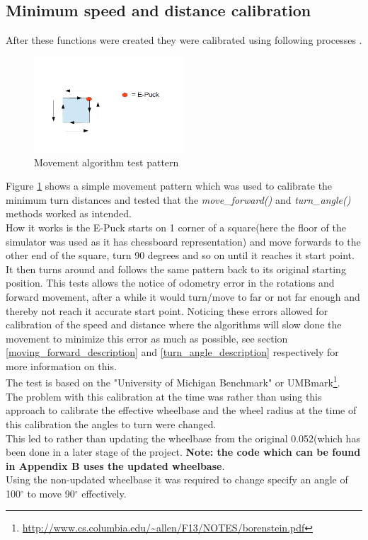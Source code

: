 \subsection{Minimum speed and distance calibration}
After these functions were created they were calibrated using following processes .\\

\begin{figure}[h]
\centering
\includegraphics[width = 0.5\textwidth]{../../figures/movement_test.png} 
\caption{Movement algorithm test pattern}
\label{movement_test}
\end{figure}

Figure \ref{movement_test} shows a simple movement pattern which was used to calibrate the minimum turn distances and tested that the \textit{move\_forward()} and \textit{turn\_angle()} methods worked as intended. \\
How it works is the E-Puck starts on 1 corner of a square(here the floor of the simulator was used as it has chessboard representation) and move forwards to the other end of the square, turn 90 degrees and so on until it reaches it start point. It then turns around and follows the same pattern back to its original starting position. This tests allows the notice of odometry error in the rotations and forward movement, after a while it would turn/move to far or not far enough and thereby not reach it accurate start point. Noticing these errors allowed for calibration of the speed and distance where the algorithms will slow done the movement to minimize this error as much as possible, see section \ref{moving_forward_description} and \ref{turn_angle_description} respectively for more information on this.\\[3ex]
The test is based on the "University of Michigan Benchmark" or UMBmark\footnote{\url{http://www.cs.columbia.edu/~allen/F13/NOTES/borenstein.pdf}}.\\[3ex]

The problem with this calibration at the time was rather than using this approach to calibrate the effective wheelbase and the wheel radius at the time of this calibration the angles to turn were changed.\\
This led to rather than updating the wheelbase from  the original 0.052(which has been done in a later stage of the project. \textbf{Note: the code which can be found in Appendix B uses the updated wheelbase}.\\
Using the non-updated wheelbase it was required to change specify an angle of 100$^{\circ}$ to move 90$^{\circ}$ effectively.

